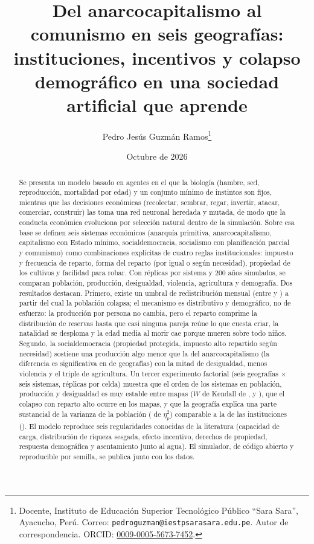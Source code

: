 \documentclass[11pt,a4paper]{article}
\title{Del anarcocapitalismo al comunismo en seis geografías:\\ instituciones, incentivos y colapso demográfico en una sociedad artificial que aprende}
\author{Pedro Jesús Guzmán Ramos\thanks{Docente, Instituto de Educación Superior Tecnológico Público ``Sara Sara'', Ayacucho, Perú. Correo: \texttt{pedroguzman@iestpsarasara.edu.pe}. Autor de correspondencia. ORCID: \href{https://orcid.org/0009-0005-5673-7452}{0009-0005-5673-7452}.}}
\date{Octubre de 2026}
\begin{document}
\maketitle

\begin{abstract}
\noindent Se presenta un modelo basado en agentes en el que la biología (hambre, sed, reproducción, mortalidad por edad) y un conjunto mínimo de instintos son fijos, mientras que las decisiones económicas (recolectar, sembrar, regar, invertir, atacar, comerciar, construir) las toma una red neuronal heredada y mutada, de modo que la conducta económica evoluciona por selección natural dentro de la simulación. Sobre esa base se definen seis sistemas económicos (anarquía primitiva, anarcocapitalismo, capitalismo con Estado mínimo, socialdemocracia, socialismo con planificación parcial y comunismo) como combinaciones explícitas de cuatro reglas institucionales: impuesto y frecuencia de reparto, forma del reparto (por igual o según necesidad), propiedad de los cultivos y facilidad para robar. Con \nReplicas{} réplicas por sistema y 200 años simulados, se comparan población, producción, desigualdad, violencia, agricultura y demografía. Dos resultados destacan. Primero, existe un umbral de redistribución mensual (entre \umbralImpuestoPrevio{} y \umbralImpuesto{}) a partir del cual la población colapsa; el mecanismo es distributivo y demográfico, no de esfuerzo: la producción por persona no cambia, pero el reparto comprime la distribución de reservas hasta que casi ninguna pareja reúne lo que cuesta criar, la natalidad se desploma y la edad media al morir cae porque mueren sobre todo niños. Segundo, la socialdemocracia (propiedad protegida, impuesto alto repartido según necesidad) sostiene una producción algo menor que la del anarcocapitalismo (la diferencia es significativa en \mapasSocdemProdMenor{} de \nMapas{} geografías) con la mitad de desigualdad, menos violencia y el triple de agricultura. Un tercer experimento factorial (seis geografías $\times$ seis sistemas, \nRepMapas{} réplicas por celda) muestra que el orden de los sistemas en población, producción y desigualdad es muy estable entre mapas ($W$ de Kendall de \kendallPob{}, \kendallProd{} y \kendallGini{}), que el colapso con reparto alto ocurre en los \nMapas{} mapas, y que la geografía explica una parte sustancial de la varianza de la población (\etaPobMapa{} de $\eta^2_p$) comparable a la de las instituciones (\etaPobSistema). El modelo reproduce seis regularidades conocidas de la literatura (capacidad de carga, distribución de riqueza sesgada, efecto incentivo, derechos de propiedad, respuesta demográfica y asentamiento junto al agua). El simulador, de código abierto y reproducible por semilla, se publica junto con los datos.


\end{abstract}
\end{document}
